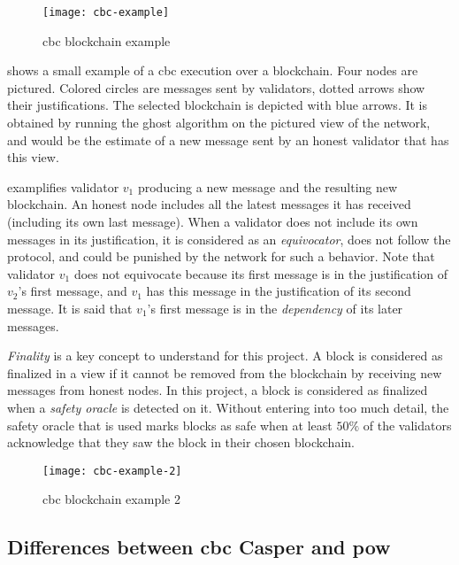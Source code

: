 \begin{figure}[h]
	\centering
	\texttt{[image: cbc-example]}
    \caption{\gls{cbc} blockchain example}
	\label{fig:example}
\end{figure}

 shows a small example of a \gls{cbc} execution
over a blockchain. Four nodes are pictured. Colored circles are messages sent by
validators, dotted arrows show their justifications. The selected blockchain is
depicted with blue arrows. It is obtained by running the \gls{ghost} algorithm
on the pictured view of the network, and would be the estimate of a new message
sent by an honest validator that has this view.

 examplifies validator \(v_1\) producing a new message
and the resulting new blockchain. An honest node includes all the latest
messages it has received (including its own last message). When a validator does
not include its own messages in its justification, it is considered as an
\textit{equivocator}, does not follow the protocol, and could be punished by
the network for such a behavior. Note that validator \(v_1\) does not equivocate
because its first message is in the justification of \(v_2\)'s first message,
and \(v_1\) has this message in the justification of its second message. It is
said that \(v_1\)'s first message is in the \textit{dependency} of its later
messages.

\textit{Finality} is a key concept to understand for this project. A block is
considered as finalized in a view if it cannot be removed from the blockchain by
receiving new messages from honest nodes. In this project, a block is considered
as finalized when a \textit{safety oracle} \cite{abstractCBC} is detected on it.
Without entering into too much detail, the safety oracle that is used marks
blocks as safe when at least \(50\%\) of the validators acknowledge that they
saw the block in their chosen blockchain. 

\begin{figure}[h]
	\centering
	\texttt{[image: cbc-example-2]}
    \caption{\gls{cbc} blockchain example 2}
	\label{fig:example2}
\end{figure}

\FloatBarrier
\subsection{Differences between \gls{cbc} Casper and \gls{pow}}
\label{ssec:powVsPos}

